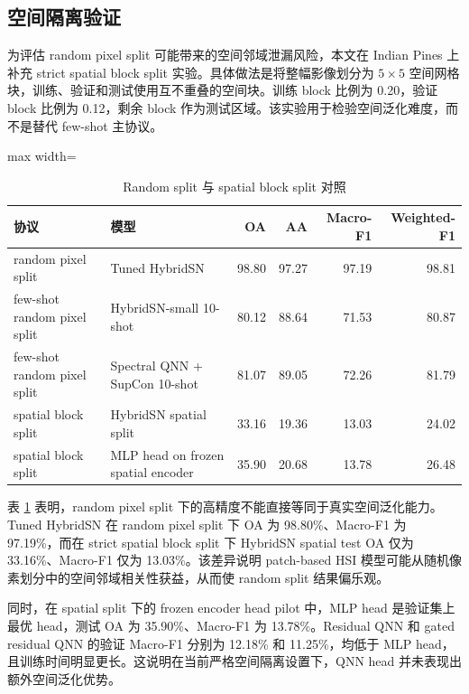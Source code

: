 \documentclass[UTF8,a4paper,zihao=-4,fontset=fandol]{ctexart}
\begin{document}
\subsection{空间隔离验证}

为评估 random pixel split 可能带来的空间邻域泄漏风险，本文在 Indian Pines 上补充 strict spatial block split 实验。具体做法是将整幅影像划分为 $5\times5$ 空间网格块，训练、验证和测试使用互不重叠的空间块。训练 block 比例为 0.20，验证 block 比例为 0.12，剩余 block 作为测试区域。该实验用于检验空间泛化难度，而不是替代 few-shot 主协议。

\begin{table}[htbp]
\centering
\caption{Random split 与 spatial block split 对照}
\label{tab:spatial-isolation}
\begin{adjustbox}{max width=\textwidth}
\begin{tabular}{llrrrr}
\toprule
协议 & 模型 & OA & AA & Macro-F1 & Weighted-F1 \\
\midrule
random pixel split & Tuned HybridSN & 98.80 & 97.27 & 97.19 & 98.81 \\
few-shot random pixel split & HybridSN-small 10-shot & 80.12 & 88.64 & 71.53 & 80.87 \\
few-shot random pixel split & Spectral QNN + SupCon 10-shot & 81.07 & 89.05 & 72.26 & 81.79 \\
spatial block split & HybridSN spatial split & 33.16 & 19.36 & 13.03 & 24.02 \\
spatial block split & MLP head on frozen spatial encoder & 35.90 & 20.68 & 13.78 & 26.48 \\
\bottomrule
\end{tabular}
\end{adjustbox}
\end{table}

表 \ref{tab:spatial-isolation} 表明，random pixel split 下的高精度不能直接等同于真实空间泛化能力。Tuned HybridSN 在 random pixel split 下 OA 为 98.80\%、Macro-F1 为 97.19\%，而在 strict spatial block split 下 HybridSN spatial test OA 仅为 33.16\%、Macro-F1 仅为 13.03\%。该差异说明 patch-based HSI 模型可能从随机像素划分中的空间邻域相关性获益，从而使 random split 结果偏乐观。

同时，在 spatial split 下的 frozen encoder head pilot 中，MLP head 是验证集上最优 head，测试 OA 为 35.90\%、Macro-F1 为 13.78\%。Residual QNN 和 gated residual QNN 的验证 Macro-F1 分别为 12.18\% 和 11.25\%，均低于 MLP head，且训练时间明显更长。这说明在当前严格空间隔离设置下，QNN head 并未表现出额外空间泛化优势。
\end{document}
